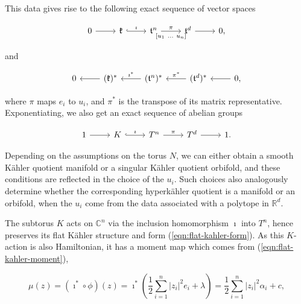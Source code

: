 \documentclass{amsart}
\newcommand{\RR}{\mathbb{R}}
\newcommand{\CC}{\mathbb{C}}
\newcommand{\mfk}{\mathfrak{k}}
\newcommand{\mft}{\mathfrak{t}}
\begin{document}
    This data gives rise to the following exact sequence of vector spaces
    
    \begin{equation}\label{eqn:lie-algebra-seq}
        \begin{tikzcd}[ampersand replacement=\&]
            0 \ar[r] \& \mfk \ar[r, hook, "\imath"] \& \mft^{n} \arrow{r}{\pi}[swap]{[u_{1}\ \ldots \ u_{n}]} \& \mft^{d} \ar[r] \& 0,
        \end{tikzcd}
    \end{equation}
    
    and
    
    \begin{equation}\label{eqn:dual-lie-algebra-seq}
        \begin{tikzcd}[ampersand replacement=\&]
            0 \& \ar[l]	(\mfk)^{\ast} \& \ar[l, "\imath^{\ast}", swap] (\mft^{n})^{\ast} \& \arrow{l}[swap]{\pi^{\ast}} (\mft^{d})^{\ast} \& \ar[l] 0,
        \end{tikzcd}
    \end{equation}
    
    where $\pi$ maps $e_{i}$ to $u_{i}$, and $\pi^{\ast}$ is the transpose of its matrix representative. Exponentiating, we also get an exact sequence of abelian groups
    
    \begin{equation}\label{eqn:lie-group-seq}
        \begin{tikzcd}[ampersand replacement=\&]
            1 \ar[r] \& K \ar[r, hook, "\imath"] \& T^{n} \arrow{r}{\pi} \& T^{d} \ar[r] \& 1.
        \end{tikzcd}
    \end{equation}
    
    Depending on the assumptions on the torus $N$, we can either obtain a smooth K\"ahler quotient manifold or a singular K\"ahler quotient orbifold, and these conditions are reflected in the choice of the $u_{i}$. Such choices also analogously determine whether the corresponding hyperk\"ahler quotient is a manifold or an orbifold, when the $u_{i}$ come from the data associated with a polytope in $\RR^{d}$.
    
    The subtorus $K$ acts on $\CC^{n}$ via the inclusion homomorphism $\imath$ into $T^{n}$, hence preserves its flat K\"ahler structure and form (\ref{eqn:flat-kahler-form}). As this $K$-action is also Hamiltonian, it has a moment map which comes from (\ref*{eqn:flat-kahler-moment}),
    
    \begin{equation*}\label{eqn:K-moment-map}
        \mu(z) = (\imath^{\ast} \circ \phi)(z) = \imath^{\ast} \left(\frac{1}{2}\sum_{i=1}^{n}|z_{i}|^{2}e_{i} + \lambda\right) = \frac{1}{2}\sum_{i=1}^{n}|z_{i}|^{2}\alpha_{i} + c,
    \end{equation*}
\end{document}
